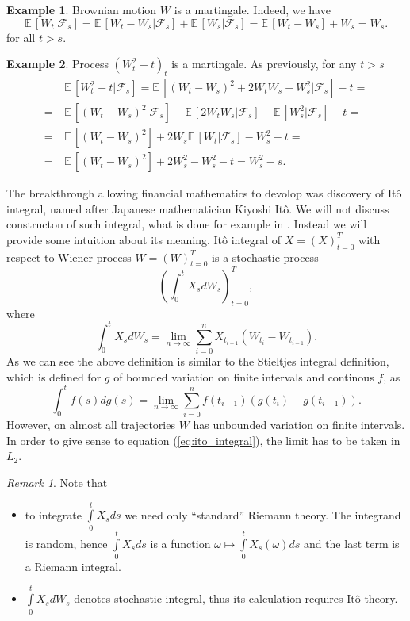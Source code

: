 \documentclass[a4paper,12pt, oneside]{book}
\theoremstyle{definition}
\newtheorem{example}{Example}[section]
\theoremstyle{remark}
\newtheorem{remark}{Remark}
\def\E{{\mathbb{E}}\,}
\begin{document}
\begin{example}
 Brownian motion $W$ is a martingale. Indeed, we have
 \begin{equation*}
  \E[W_t|\mathcal{F}_s] = \E[W_t-W_s|\mathcal{F}_s] + \E[W_s|\mathcal{F}_s] = \E[W_t-W_s] + W_s = W_s.
 \end{equation*}
 for all $t > s$.
\end{example}
\begin{example}
 \label{ex:angleWt}
 Process $(W_t^2-t)_t$ is a martingale. As previously, for any $t > s$
 \begin{equation*}
  \begin{split}
       & \E[W_t^2-t|\mathcal{F}_s] = \E[(W_t-W_s)^2 + 2W_tW_s - W_s^2|\mathcal{F}_s] -t =\\ 
    =\ & \E[(W_t-W_s)^2|\mathcal{F}_s] + \E[2W_tW_s|\mathcal{F}_s] - \E[W_s^2|\mathcal{F}_s] -t = \\
    =\ & \E[(W_t-W_s)^2] + 2W_s\E[W_t|\mathcal{F}_s] - W_s^2 -t = \\
    =\ & \E[(W_t-W_s)^2] + 2W_s^2 - W_s^2 -t = W_s^2 - s.
  \end{split}
 \end{equation*}
\end{example}

The breakthrough allowing financial mathematics to devolop was discovery of It\^{o} integral, named after Japanese mathematician Kiyoshi It\^{o}. We will not discuss constructon of such integral, what is done for example in \cite{latala}. Instead we will provide some intuition about its meaning. It\^{o} integral of $X=(X)_{t=0}^T$ with respect to Wiener process $W=(W)_{t=0}^T$ is a stochastic process
\[ \left( \int_0^{t} X_s dW_s \right)_{t = 0}^T, \]
where
\begin{equation}
 \label{eq:ito_integral}
  \int_0^{t} X_s dW_s = \lim_{n \rightarrow \infty} \sum\limits_{i=0}^n X_{t_{i-1}} (W_{t_i} - W_{t_{i-1}}).
\end{equation}
As we can see the above definition is similar to the Stieltjes integral definition, which is defined for $g$ of bounded variation on finite intervals and continous $f$, as
\[  \int_0^{t} f(s) dg(s) = \lim_{n \rightarrow \infty} \sum\limits_{i=0}^n f(t_{i-1}) (g(t_i) - g(t_{i-1})). \]
However, on almost all trajectories $W$ has unbounded variation on finite intervals. In order to give sense to equation (\ref{eq:ito_integral}), the limit has to be taken in $L_2$.

\begin{remark} Note that
\begin{itemize}
 \item to integrate $\int\limits_0^t X_s ds$ we need only ``standard'' Riemann theory. The integrand is random, hence $\int\limits_0^t X_s ds$ is a function $\omega \mapsto \int\limits_0^t X_s(\omega) ds$ and the last term is a Riemann integral.
 \item $\int\limits_0^t X_s dW_s$ denotes stochastic integral, thus its calculation requires It\^{o} theory.
\end{itemize}
\end{remark}
\end{document}
